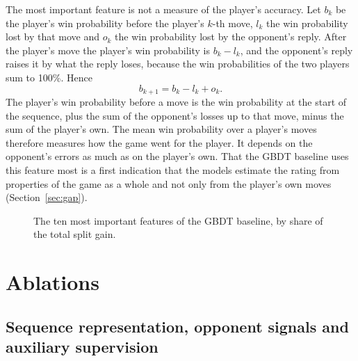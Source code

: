 \documentclass[11pt]{article}
\begin{document}
The most important feature is not a measure of the player's accuracy. Let
$b_k$ be the player's win probability before the player's $k$-th move, $l_k$
the win probability lost by that move and $o_k$ the win probability lost by
the opponent's reply. After the player's move the player's win probability is
$b_k - l_k$, and the opponent's reply raises it by what the reply loses,
because the win probabilities of the two players sum to 100\%. Hence
\[
b_{k+1} = b_k - l_k + o_k .
\]
The player's win probability before a move is the win probability at the
start of the sequence, plus the sum of the opponent's losses up to that move,
minus the sum of the player's own. The mean win probability over a player's
moves therefore measures how the game went for the player. It depends on the
opponent's errors as much as on the player's own. That the GBDT baseline uses
this feature most is a first indication that the models estimate the rating
from properties of the game as a whole and not only from the player's own
moves\iflook{} (Section~\ref{sec:gap})\fi.

\begin{figure}[htbp]\centering
{}
\caption{The ten most important features of the GBDT baseline, by share of
the total split gain.}
\label{fig:leans}
\end{figure}

\ifchanges
\section{Ablations}
\label{sec:ablations}



\subsection{Sequence representation, opponent signals and auxiliary supervision}
\label{sec:seq-ablations}
\end{document}
